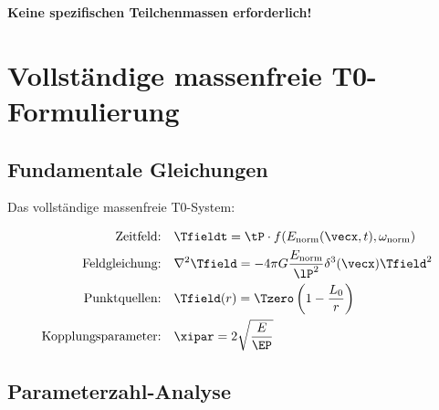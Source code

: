 	\textbf{Keine spezifischen Teilchenmassen erforderlich!}
	
	\section{Vollständige massenfreie T0-Formulierung}
	\label{sec:complete_formulation}
	
	\subsection{Fundamentale Gleichungen}
	\label{subsec:fundamental_equations}
	
	Das vollständige massenfreie T0-System:
	
	\begin{tcolorbox}[colback=blue!5!white,colframe=blue!75!black,title=Massenfreies T0-Modell]
		\begin{align}
			\text{Zeitfeld:} \quad &\Tfieldt = \tP \cdot f(E_{\text{norm}}(\vecx,t), \omega_{\text{norm}}) \\
			\text{Feldgleichung:} \quad &\nabla^2 \Tfield = -4\pi G \frac{E_{\text{norm}}}{\lP^2} \delta^3(\vecx) \Tfield^2 \\
			\text{Punktquellen:} \quad &\Tfield(r) = \Tzero\left(1 - \frac{L_0}{r}\right) \\
			\text{Kopplungsparameter:} \quad &\xipar = 2\sqrt{\frac{E}{\EP}}
		\end{align}
	\end{tcolorbox}
	
	\subsection{Parameterzahl-Analyse}
	\label{subsec:parameter_count}
	
	\begin{center}
	\end{center}
	
